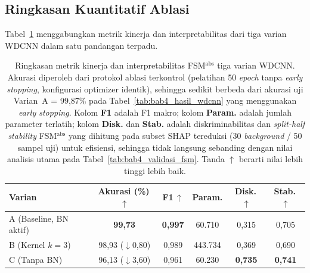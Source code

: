 \subsection{Ringkasan Kuantitatif Ablasi}
\label{subsec:bab4_ablasi_ringkasan}

Tabel~\ref{tab:bab4_ablasi_bn} menggabungkan metrik kinerja dan interpretabilitas
dari tiga varian WDCNN dalam satu pandangan terpadu.

\begin{table}[ht]
\caption{Ringkasan metrik kinerja dan interpretabilitas FSM$^{\text{abs}}$
         tiga varian WDCNN. {\color{blue}Akurasi diperoleh dari protokol
         ablasi terkontrol (pelatihan 50 \emph{epoch} tanpa \emph{early
         stopping}, konfigurasi optimizer identik), sehingga sedikit berbeda
         dari akurasi uji Varian~A = 99,87\% pada
         Tabel~\ref{tab:bab4_hasil_wdcnn} yang menggunakan \emph{early
         stopping}.} Kolom \textbf{F1} adalah F1
         makro; {\color{blue}kolom \textbf{Param.} adalah jumlah parameter
         terlatih; kolom \textbf{Disk.} dan \textbf{Stab.} adalah
         diskriminabilitas dan \emph{split-half stability} FSM$^{\text{abs}}$
         yang dihitung pada subset SHAP tereduksi (30 \emph{background} /
         50 sampel uji) untuk efisiensi, sehingga tidak langsung sebanding
         dengan nilai analisis utama pada Tabel~\ref{tab:bab4_validasi_fsm}.}
         Tanda $\uparrow$ berarti nilai lebih tinggi lebih baik.}
\label{tab:bab4_ablasi_bn}
\centering
\begin{tabular}{lccc|cc}
\toprule
\textbf{Varian} & \textbf{Akurasi (\%)\,$\uparrow$} & \textbf{F1\,$\uparrow$}
                & {\color{blue}\textbf{Param.}}
                & \textbf{Disk.\,$\uparrow$} & \textbf{Stab.\,$\uparrow$}\\
\midrule
A (Baseline, BN aktif) & \textbf{99,73} & \textbf{0,997} & {\color{blue}60.710} & {\color{blue}0,315} & {\color{blue}0,705}\\
B (Kernel $k=3$)       & 98,93 ($\downarrow$0,80) & 0,989 & {\color{blue}443.734} & {\color{blue}0,369} & {\color{blue}0,690}\\
C (Tanpa BN)           & 96,13 ($\downarrow$3,60) & 0,961 & {\color{blue}60.230} & {\color{blue}\textbf{0,735}} & {\color{blue}\textbf{0,741}}\\
\bottomrule
\end{tabular}
\end{table}

